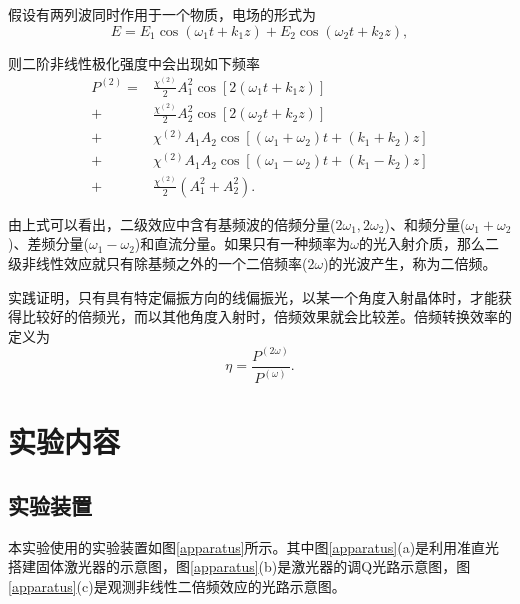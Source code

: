 \documentclass{mpltx}
\begin{document}
假设有两列波同时作用于一个物质，电场的形式为
\begin{equation}
  E=E_1\cos(\omega_1t+k_1z)+E_2\cos(\omega_2t+k_2z),
\end{equation}

则二阶非线性极化强度中会出现如下频率
\begin{equation}\label{eq:2order}
  \begin{aligned}
    P^{(2)}=&\frac{\chi^{(2)}}{2}A_1^2\cos[2(\omega_1t+k_1z)]\\
    +&\frac{\chi^{(2)}}{2}A_2^2\cos[2(\omega_2t+k_2z)]\\
    +&\chi^{(2)}A_1A_2\cos[(\omega_1+\omega_2)t+(k_1+k_2)z]\\
    +&\chi^{(2)}A_1A_2\cos[(\omega_1-\omega_2)t+(k_1-k_2)z]\\
    +&\frac{\chi^{(2)}}{2}(A_1^2+A_2^2).
  \end{aligned}
\end{equation}

由上式可以看出，二级效应中含有基频波的倍频分量($2\omega_1,2\omega_2$)、和频分量($\omega_1+\omega_2$)、差频分量($\omega_1-\omega_2$)和直流分量。如果只有一种频率为$\omega$的光入射介质，那么二级非线性效应就只有除基频之外的一个二倍频率($2\omega$)的光波产生，称为二倍频。

实践证明，只有具有特定偏振方向的线偏振光，以某一个角度入射晶体时，才能获得比较好的倍频光，而以其他角度入射时，倍频效果就会比较差。倍频转换效率的定义为
\begin{equation}
  \eta=\frac{P^{(2\omega)}}{P^{(\omega)}}.
\end{equation}
\section{实验内容}
\subsection{实验装置\cite{manual}}
本实验使用的实验装置如图\ref{apparatus}所示。其中图\ref{apparatus}(a)是利用准直光搭建固体激光器的示意图，图\ref{apparatus}(b)是激光器的调Q光路示意图，图\ref{apparatus}(c)是观测非线性二倍频效应的光路示意图。
\end{document}
